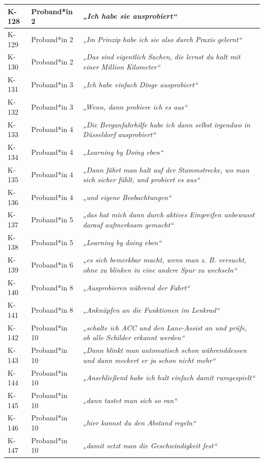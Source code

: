 {\begin{xltabular}{\textwidth}{
    |P{0.10\textwidth}
    |P{0.17\textwidth}
    |Y|
}
K-128 & Proband*in 2 & \textit{„Ich habe sie ausprobiert“} \\
\hline
K-129 & Proband*in 2 & \textit{„Im Prinzip habe ich sie also durch Praxis gelernt“} \\
\hline
K-130 & Proband*in 2 & \textit{„Das sind eigentlich Sachen, die lernst du halt mit einer Million Kilometer“} \\
\hline
K-131 & Proband*in 3 & \textit{„Ich habe einfach Dinge ausprobiert“} \\
\hline
K-132 & Proband*in 3 & \textit{„Wenn, dann probiere ich es aus“} \\
\hline
K-133 & Proband*in 4 & \textit{„Die Berganfahrhilfe habe ich dann selbst irgendwo in Düsseldorf ausprobiert“} \\
\hline
K-134 & Proband*in 4 & \textit{„Learning by Doing eben“} \\
\hline
K-135 & Proband*in 4 & \textit{„Dann fährt man halt auf der Stammstrecke, wo man sich sicher fühlt, und probiert es aus“} \\
\hline
K-136 & Proband*in 4 & \textit{„und eigene Beobachtungen“} \\
\hline
K-137 & Proband*in 5 & \textit{„das hat mich dann durch aktives Eingreifen unbewusst darauf aufmerksam gemacht“} \\
\hline
K-138 & Proband*in 5 & \textit{„Learning by doing eben“} \\
\hline
K-139 & Proband*in 6 & \textit{„es sich bemerkbar macht, wenn man z. B. versucht, ohne zu blinken in eine andere Spur zu wechseln“} \\
\hline
K-140 & Proband*in 8 & \textit{„Ausprobieren während der Fahrt“} \\
\hline
K-141 & Proband*in 8 & \textit{„Anknüpfen an die Funktionen im Lenkrad“} \\
\hline
K-142 & Proband*in 10 & \textit{„schalte ich ACC und den Lane-Assist an und prüfe, ob alle Schilder erkannt werden“} \\
\hline
K-143 & Proband*in 10 & \textit{„Dann blinkt man automatisch schon währenddessen und dann meckert er ja schon nicht mehr“} \\
\hline
K-144 & Proband*in 10 & \textit{„Anschließend habe ich halt einfach damit rumgespielt“} \\
\hline
K-145 & Proband*in 10 & \textit{„dann tastet man sich so ran“} \\
\hline
K-146 & Proband*in 10 & \textit{„hier kannst du den Abstand regeln“} \\
\hline
K-147 & Proband*in 10 & \textit{„damit setzt man die Geschwindigkeit fest“} \\

\end{xltabular}}
